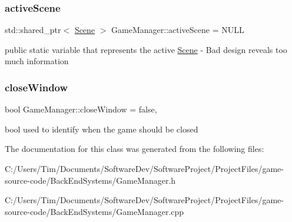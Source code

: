 \subsubsection{\texorpdfstring{active\+Scene}{activeScene}}
{\footnotesize\ttfamily std\+::shared\+\_\+ptr$<$ \hyperlink{class_scene}{Scene} $>$ Game\+Manager\+::active\+Scene = N\+U\+LL\hspace{0.3cm}{\ttfamily [static]}}

public static variable that represents the active \hyperlink{class_scene}{Scene} -\/ Bad design reveals too much information \mbox{\label{class_game_manager_a07c75a9507a0d82f88a0b62d808fcf3c}} 
\subsubsection{\texorpdfstring{close\+Window}{closeWindow}}
{\footnotesize\ttfamily bool Game\+Manager\+::close\+Window = false\hspace{0.3cm}{\ttfamily [static]}, {\ttfamily [private]}}

bool used to identify when the game should be closed 

The documentation for this class was generated from the following files\+:\begin{DoxyCompactItemize}
\item 
C\+:/\+Users/\+Tim/\+Documents/\+Software\+Dev/\+Software\+Project/\+Project\+Files/game-\/source-\/code/\+Back\+End\+Systems/Game\+Manager.\+h\item 
C\+:/\+Users/\+Tim/\+Documents/\+Software\+Dev/\+Software\+Project/\+Project\+Files/game-\/source-\/code/\+Back\+End\+Systems/Game\+Manager.\+cpp\end{DoxyCompactItemize}
